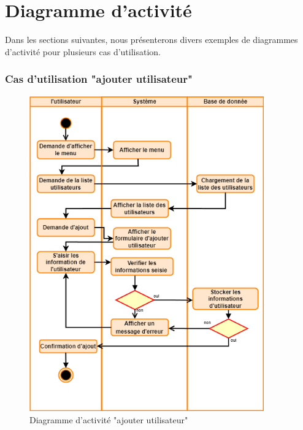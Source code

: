 \documentclass[edit,12pt,a4paper,ChapStyle,oneside,doubleinterligne]{report}
\begin{document}
\section{Diagramme d'activité}
Dans les sections suivantes, nous présenterons divers exemples de diagrammes d'activité pour plusieurs cas d'utilisation.
\newpage
\subsubsection{Cas d'utilisation "ajouter utilisateur"}
\begin{figure}[h!]\label{fig:activite utilisateur}
    \centering
    \includegraphics[width=0.9\textwidth]{images/act ajouter utilisateur.png}
    \caption{Diagramme d'activité "ajouter utilisateur"}
\end{figure}

\clearpage
\end{document}
